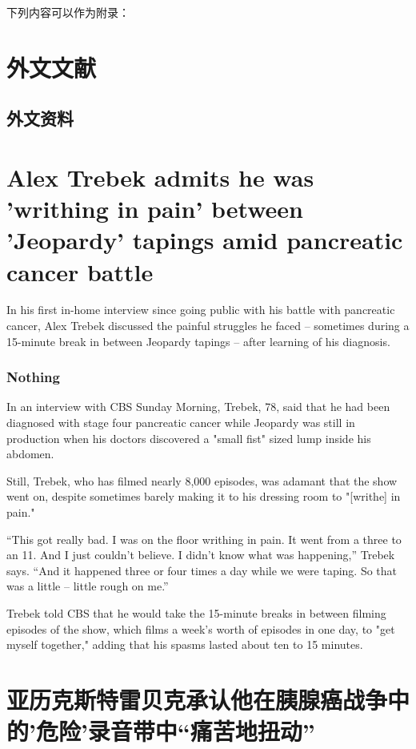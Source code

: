 \appendix
\newpage
下列内容可以作为附录：
\chapter{外文文献}
\section{外文资料}

\chapter*{Alex Trebek admits he was 'writhing in pain' between 'Jeopardy' tapings amid pancreatic cancer battle}

In his first in-home interview since going public with his battle with pancreatic cancer, Alex Trebek discussed the painful struggles he faced – sometimes during a 15-minute break in between Jeopardy tapings – after learning of his diagnosis.

\subsection{{Nothing}}
In an interview with CBS Sunday Morning, Trebek, 78, said that he had been diagnosed with stage four pancreatic cancer while Jeopardy was still in production when his doctors discovered a "small fist" sized lump inside his abdomen.

Still, Trebek, who has filmed nearly 8,000 episodes, was adamant that the show went on, despite sometimes barely making it to his dressing room to "[writhe] in pain."

“This got really bad. I was on the floor writhing in pain. It went from a three to an 11. And I just couldn’t believe. I didn’t know what was happening,” Trebek says. “And it happened three or four times a day while we were taping. So that was a little – little rough on me.”

Trebek told CBS that he would take the 15-minute breaks in between filming episodes of the show, which films a week's worth of episodes in one day, to "get myself together," adding that his spasms lasted about ten to 15 minutes.


\chapter*{亚历克斯特雷贝克承认他在胰腺癌战争中的'危险'录音带中“痛苦地扭动”}

